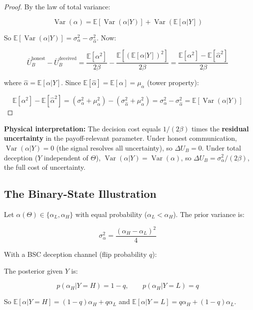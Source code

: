 \documentclass[11pt]{article}
\theoremstyle{plain}
\theoremstyle{definition}
\theoremstyle{remark}
\let\origsubsection\subsection
\renewcommand{\subsection}{\needspace{7\baselineskip}\origsubsection}
\begin{document}
\begin{proof}
By the law of total variance:

$$\operatorname{Var}(\alpha) = \mathbb{E}[\operatorname{Var}(\alpha | Y)] + \operatorname{Var}(\mathbb{E}[\alpha | Y])$$

So $\mathbb{E}[\operatorname{Var}(\alpha | Y)] = \sigma_\alpha^2 - \sigma_{\hat{\alpha}}^2$. Now:

$$\bar{U}_B^{\text{honest}} - \bar{U}_B^{\text{deceived}} = \frac{\mathbb{E}[\alpha^2]}{2\beta} - \frac{\mathbb{E}[(\mathbb{E}[\alpha|Y])^2]}{2\beta} = \frac{\mathbb{E}[\alpha^2] - \mathbb{E}[\hat{\alpha}^2]}{2\beta}$$

where $\hat{\alpha} = \mathbb{E}[\alpha | Y]$. Since $\mathbb{E}[\hat{\alpha}] = \mathbb{E}[\alpha] = \mu_\alpha$ (tower property):

$$\mathbb{E}[\alpha^2] - \mathbb{E}[\hat{\alpha}^2] = (\sigma_\alpha^2 + \mu_\alpha^2) - (\sigma_{\hat{\alpha}}^2 + \mu_\alpha^2) = \sigma_\alpha^2 - \sigma_{\hat{\alpha}}^2 = \mathbb{E}[\operatorname{Var}(\alpha | Y)]$$
\end{proof}

\textbf{Physical interpretation:} The decision cost equals
\(1/(2\beta)\) times the \textbf{residual uncertainty} in the
payoff-relevant parameter. Under honest communication,
\(\operatorname{Var}(\alpha | Y) = 0\) (the signal resolves all
uncertainty), so \(\Delta U_B = 0\). Under total deception (\(Y\)
independent of \(\Theta\)),
\(\operatorname{Var}(\alpha | Y) = \operatorname{Var}(\alpha)\), so
\(\Delta U_B = \sigma_\alpha^2 / (2\beta)\), the full cost of
uncertainty.

\subsection{The Binary-State
Illustration}\label{the-binary-state-illustration}

Let \(\alpha(\Theta) \in \{\alpha_L, \alpha_H\}\) with equal probability
(\(\alpha_L < \alpha_H\)). The prior variance is:

\[\sigma_\alpha^2 = \frac{(\alpha_H - \alpha_L)^2}{4}\]

With a BSC deception channel (flip probability \(q\)):

The posterior given \(Y\) is:

\[p(\alpha_H | Y = H) = 1 - q, \qquad p(\alpha_H | Y = L) = q\]

So \(\mathbb{E}[\alpha | Y = H] = (1-q)\alpha_H + q\alpha_L\) and
\(\mathbb{E}[\alpha | Y = L] = q\alpha_H + (1-q)\alpha_L\).
\end{document}
